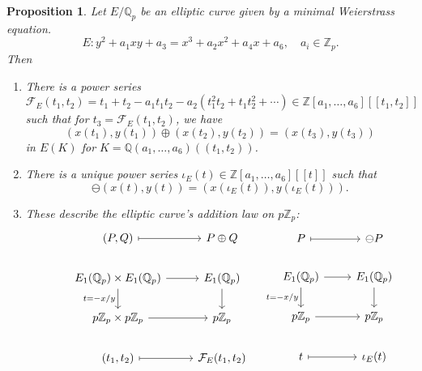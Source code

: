 \documentclass[a4paper]{article}
\newtheorem{proposition}[theorem]{Proposition}
\theoremstyle{definition}
\newcommand{\series}[2]{#1[\![#2]\!]}
\newcommand{\lseries}[2]{#1(\!(#2)\!)}
\newcommand{\calF}{\mathcal{F}}
\newcommand{\Z}{\mathbb{Z}}
\newcommand{\Q}{\mathbb{Q}}
\begin{document}
\begin{proposition}
    Let $E/\Q_p$ be an elliptic curve given by a minimal Weierstrass equation.
    \begin{equation*}
        E:y^2+a_1xy+a_3=x^3+a_2x^2+a_4x+a_6,\quad a_i\in\Z_p.
    \end{equation*}
    Then
    \begin{enumerate}[label=(\roman*)]
        \item There is a power series
            \begin{equation*}
                \calF_E(t_1,t_2)
                    = t_1+t_2-a_1t_1t_2-a_2(t_1^2t_2+t_1t_2^2 + \cdots)
                    \in \series{\Z[a_1,\ldots,a_6]}{t_1,t_2}
            \end{equation*}
            such that for $t_3=\calF_E(t_1,t_2)$, we have
            \begin{equation*}
                (x(t_1),y(t_1)) \oplus (x(t_2),y(t_2)) = (x(t_3),y(t_3))
            \end{equation*}
            in $E(K)$ for $K=\lseries{\Q(a_1,\ldots,a_6)}{t_1,t_2}$.

        \item There is a unique power series
            $\iota_E(t)\in\series{\Z[a_1,\ldots,a_6]}{t}$ such that
            \begin{equation*}
                \ominus(x(t),y(t)) = (x(\iota_E(t)),y(\iota_E(t))).
            \end{equation*}

        \item These describe the elliptic curve's addition law on $p\Z_p$:
            \begin{equation*}
                \begin{tikzcd}
                    &(P,Q) \ar[r,mapsto] &P\oplus Q \\
                    &E_1(\Q_p)\times E_1(\Q_p) \ar[d,"t=-x/y",swap] \ar[r]
                    &E_1(\Q_p) \ar[d] \\
                    &p\Z_p\times p\Z_p \ar[r]
                    &p\Z_p \\
                    &(t_1,t_2) \ar[r,mapsto] &\calF_E(t_1,t_2)
                \end{tikzcd}
                \begin{tikzcd}
                    &P \ar[r,mapsto] &\ominus P \\
                    &E_1(\Q_p) \ar[d,"t=-x/y",swap] \ar[r] &E_1(\Q_p) \ar[d] \\
                    &p\Z_p \ar[r] &p\Z_p \\
                    &t \ar[r,mapsto] &\iota_E(t)
                \end{tikzcd}
            \end{equation*}
    \end{enumerate}
\end{proposition}
\end{document}
